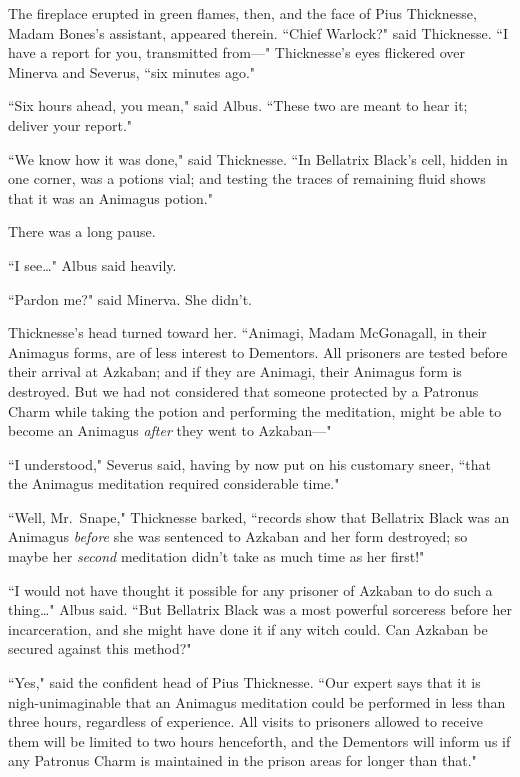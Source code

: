 The fireplace erupted in green flames, then, and the face of Pius Thicknesse, Madam Bones's assistant, appeared therein. ``Chief Warlock?" said Thicknesse. ``I have a report for you, transmitted from---" Thicknesse's eyes flickered over Minerva and Severus, ``six minutes ago."

``Six hours ahead, you mean," said Albus. ``These two are meant to hear it; deliver your report."

``We know how it was done," said Thicknesse. ``In Bellatrix Black's cell, hidden in one corner, was a potions vial; and testing the traces of remaining fluid shows that it was an Animagus potion."

There was a long pause.

``I see{\ldots}" Albus said heavily.

``Pardon me?" said Minerva. She didn't.

Thicknesse's head turned toward her. ``Animagi, Madam McGonagall, in their Animagus forms, are of less interest to Dementors. All prisoners are tested before their arrival at Azkaban; and if they are Animagi, their Animagus form is destroyed. But we had not considered that someone protected by a Patronus Charm while taking the potion and performing the meditation, might be able to become an Animagus \emph{after} they went to Azkaban---"

``I understood," Severus said, having by now put on his customary sneer, ``that the Animagus meditation required considerable time."

``Well, Mr.~Snape," Thicknesse barked, ``records show that Bellatrix Black was an Animagus \emph{before} she was sentenced to Azkaban and her form destroyed; so maybe her \emph{second} meditation didn't take as much time as her first!"

``I would not have thought it possible for any prisoner of Azkaban to do such a thing{\ldots}" Albus said. ``But Bellatrix Black was a most powerful sorceress before her incarceration, and she might have done it if any witch could. Can Azkaban be secured against this method?"

``Yes," said the confident head of Pius Thicknesse. ``Our expert says that it is nigh-unimaginable that an Animagus meditation could be performed in less than three hours, regardless of experience. All visits to prisoners allowed to receive them will be limited to two hours henceforth, and the Dementors will inform us if any Patronus Charm is maintained in the prison areas for longer than that."

